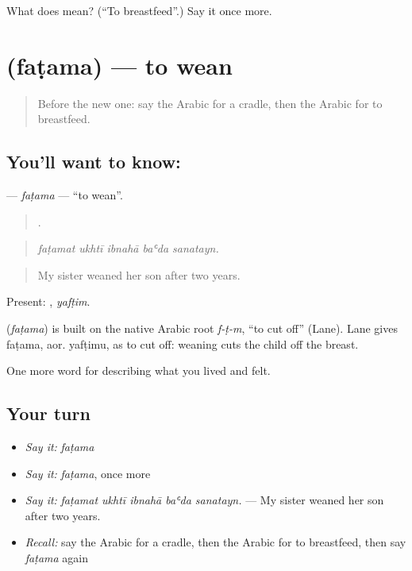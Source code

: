 \begin{tcolorbox}[breakable,colback=teal!4,colframe=teal!35!black,title={Before you move on}]
What does  mean? (\textquotedblleft{}To breastfeed\textquotedblright{}.) Say it once more.
\end{tcolorbox}
\section[\texorpdfstring{\ar{فطم} (faṭama)}{فطم (faṭama)}]{ (faṭama) — to wean}

\label{lesson:AR-C530-fatama}



\begin{quote}
Before the new one: say the Arabic for a cradle, then the Arabic for to breastfeed.
\end{quote}

\subsection*{You'll want to know: }
\textbf{} — \emph{faṭama} — \textquotedblleft{}to wean\textquotedblright{}.

\begin{quote}
    .
\end{quote}

\begin{quote}
\emph{faṭamat ukhtī ibnahā baʿda sanatayn.}
\end{quote}

\begin{quote}
My sister weaned her son after two years.
\end{quote}

Present: , \emph{yafṭim}.

\begin{cousinweb}
\textbf{} (\emph{faṭama}) is built on the native Arabic root \emph{f-ṭ-m}, \textquotedblleft{}to cut off\textquotedblright{} (Lane). Lane gives faṭama, aor. yafṭimu, as to cut off: weaning cuts the child off the breast.
\end{cousinweb}

\begin{grammarlens}[title={What you've built}]
One more word for describing what you lived and felt.
\end{grammarlens}

\subsection*{Your turn}
\begin{itemize}
\raggedright
  \item \emph{Say it:} \emph{faṭama}
  \item \emph{Say it:} \emph{faṭama}, once more
  \item \emph{Say it:} \emph{faṭamat ukhtī ibnahā baʿda sanatayn.} — My sister weaned her son after two years.
  \item \emph{Recall:} say the Arabic for a cradle, then the Arabic for to breastfeed, then say \emph{faṭama} again
\end{itemize}

